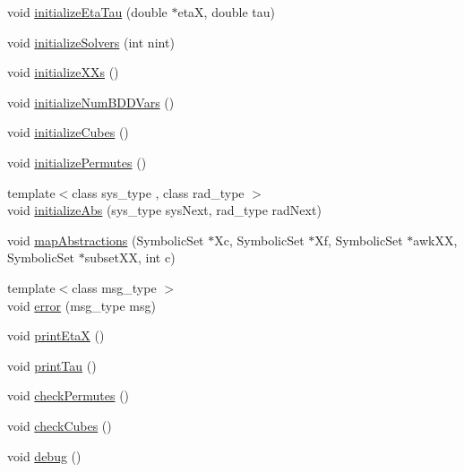 \begin{DoxyCompactItemize}
\item 
void \hyperlink{classscots_1_1Adaptive_a3dca1d73761d2678f981512dee5c325d}{initialize\+Eta\+Tau} (double $\ast$etaX, double tau)
\item 
void \hyperlink{classscots_1_1Adaptive_a25cc058f39f38402ff914ae6b927393e}{initialize\+Solvers} (int nint)
\item 
void \hyperlink{classscots_1_1Adaptive_af08ee7fae4cf6c5ae1fcabb8699e0721}{initialize\+X\+Xs} ()
\item 
void \hyperlink{classscots_1_1Adaptive_ab75f4bbed30ecc70747185f36fcab200}{initialize\+Num\+B\+D\+D\+Vars} ()
\item 
void \hyperlink{classscots_1_1Adaptive_a2b4a5e42c1a4fca883c132b02295bf11}{initialize\+Cubes} ()
\item 
void \hyperlink{classscots_1_1Adaptive_a7351461977b9be0f07ec2974531af677}{initialize\+Permutes} ()
\item 
{\footnotesize template$<$class sys\+\_\+type , class rad\+\_\+type $>$ }\\void \hyperlink{classscots_1_1Adaptive_ae8e0a243c51d3596f994f2b0668892e4}{initialize\+Abs} (sys\+\_\+type sys\+Next, rad\+\_\+type rad\+Next)
\item 
void \hyperlink{classscots_1_1Adaptive_a4e6a4284b5f3ef75816aaaefaf8fe51a}{map\+Abstractions} (Symbolic\+Set $\ast$Xc, Symbolic\+Set $\ast$Xf, Symbolic\+Set $\ast$awk\+XX, Symbolic\+Set $\ast$subset\+XX, int c)
\item 
{\footnotesize template$<$class msg\+\_\+type $>$ }\\void \hyperlink{classscots_1_1Adaptive_a550bbb19126456c000595d7e647edb25}{error} (msg\+\_\+type msg)
\item 
void \hyperlink{classscots_1_1Adaptive_af192d9fee4a464e21d88b2d9735c5053}{print\+EtaX} ()
\item 
void \hyperlink{classscots_1_1Adaptive_a7e3c0b5babfb943dcda7f7f5c89cbb3e}{print\+Tau} ()
\item 
void \hyperlink{classscots_1_1Adaptive_aba179a9fad6056239005127af2e95f45}{check\+Permutes} ()
\item 
void \hyperlink{classscots_1_1Adaptive_a5e8e6dc690e2c800338fd2c866af8889}{check\+Cubes} ()
\item 
void \hyperlink{classscots_1_1Adaptive_a8ea5724cde577baf708496d6bef7e548}{debug} ()
\end{DoxyCompactItemize}
